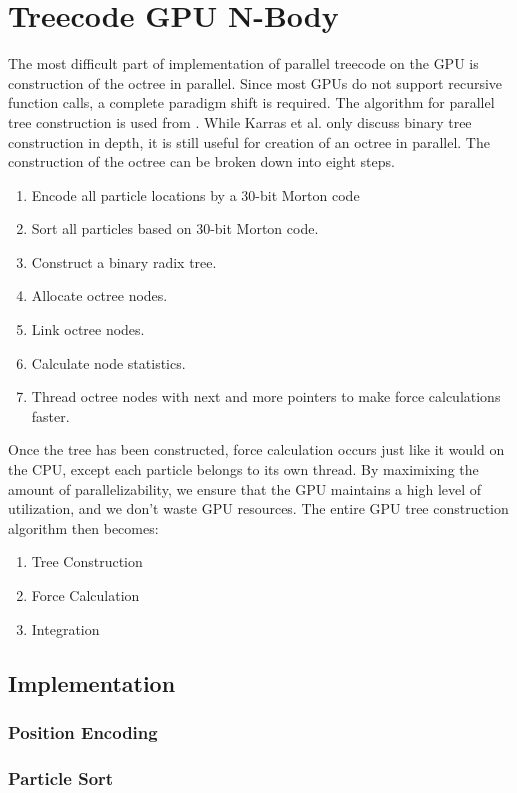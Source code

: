 \documentclass{thesis}
\begin{document}
\section{Treecode GPU N-Body}
The most difficult part of implementation of parallel treecode on the GPU is construction of the octree in parallel. Since most GPUs do not support recursive function calls, a complete paradigm shift is required. The algorithm for parallel tree construction is used from \cite{karras:2012}. While Karras et al. only discuss binary tree construction in depth, it is still useful for creation of an octree in parallel. The construction of the octree can be broken down into eight steps. 
\begin{enumerate}
    \item Encode all particle locations by a 30-bit Morton code
    \item Sort all particles based on 30-bit Morton code.
    \item Construct a binary radix tree.
    \item Allocate octree nodes.
    \item Link octree nodes.
    \item Calculate node statistics.
    \item Thread octree nodes with next and more pointers to make force calculations faster.
\end{enumerate}
Once the tree has been constructed, force calculation occurs just like it would on the CPU, except each particle belongs to its own thread. By maximixing the amount of parallelizability, we ensure that the GPU maintains a high level of utilization, and we don't waste GPU resources. The entire GPU tree construction algorithm then becomes:
\begin{enumerate}
    \item Tree Construction
    \item Force Calculation
    \item Integration
\end{enumerate}
\subsection{Implementation}
\subsubsection{Position Encoding}
\subsubsection{Particle Sort}
\end{document}
